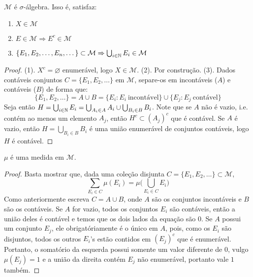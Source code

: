 \prob
\begin{prop}
    $\mathcal{M}$ é $\sigma$-álgebra. Isso é, satisfaz:
    \begin{enumerate}
        \item $X \in \mathcal{M}$
        \item $E \in \mathcal{M} \Rightarrow E^c \in \mathcal{M}$
        \item $\{E_1, E_2, \dots, E_n, \dots\} \subset \mathcal{M} \Rightarrow \bigcup_{i \in \mathbb{N}} E_i \in \mathcal{M}$
    \end{enumerate}
\end{prop}
\begin{proof}
    (1). $X^c = \varnothing$ enumerável, logo $X \in \mathcal{M}$. (2). Por construção. (3). Dados
    contáveis conjuntos $C = \{E_1, E_2, \dots\}$ em $\mathcal{M}$, separe-os em incontáveis ($A$) e contáveis ($B$) de forma que:
    $$\{E_1, E_2, \dots\} = A \cup B =  \{E_i: E_i \ \text{incontável}\} \cup \{E_j: E_j \ \text{contável}\}$$
    Seja então $H = \bigcup_{i \in \mathbb{N}} E_i = \bigcup_{A_i \in A} A_i \cup  \bigcup_{B_i \in B} B_i$. Note que se $A$ não é vazio, i.e. contém
    ao menos um elemento $A_j$, então $H^c \subset (A_j)^c$ que é contável. Se $A$ é vazio, então $H = \bigcup_{B_i \in B} B_i$ é uma união enumerável de conjuntos
    contáveis, logo $H$ é contável.
\end{proof}
\begin{prop}
    $\mu$ é uma medida em $\mathcal{M}$.
\end{prop}
\begin{proof}
    Basta mostrar que, dada uma coleção disjunta $C = \{E_1, E_2, \dots\} \subset \mathcal{M}$,
    $$\sum_{E_i \in C} \mu(E_i) = \mu\big( \bigcup_{E_i \in C} E_i \big) $$
    Como anteriormente escreva $C = A \cup B$, onde $A$ são os conjuntos incontáveis e $B$ são os contáveis.
    Se $A$ for vazio, todos os conjuntos $E_i$ são contáveis, então a união deles é contável e temos 
    que os dois lados da equação são $0$. Se $A$ possui um conjunto $E_j$, ele obrigatóriamente é o único em 
    $A$, pois, como os $E_i$ são disjuntos, todos os outros $E_i$'s estão contidos em $(E_j)^c$ que é enumerável.
    Portanto, o somatório da esquerda possui somente um valor diferente de $0$, vulgo $\mu(E_j) = 1$ e a união
    da direita contém $E_j$ não enumerável, portanto vale $1$ também.
\end{proof}

